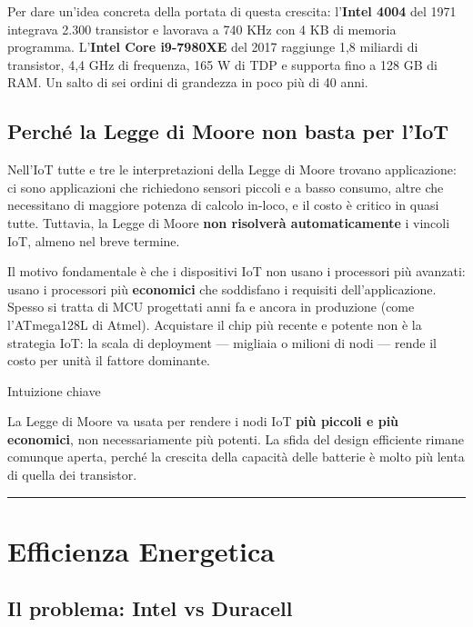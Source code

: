 \documentclass[
  italian,
  openany]{book}
\begin{document}
Per dare un'idea concreta della portata di questa crescita:
l'\textbf{Intel 4004} del 1971 integrava 2.300 transistor e lavorava a
740 KHz con 4 KB di memoria programma. L'\textbf{Intel Core i9-7980XE}
del 2017 raggiunge 1,8 miliardi di transistor, 4,4 GHz di frequenza, 165
W di TDP e supporta fino a 128 GB di RAM. Un salto di sei ordini di
grandezza in poco più di 40 anni.

\subsection{Perché la Legge di Moore non basta per
l'IoT}\label{perchuxe9-la-legge-di-moore-non-basta-per-liot}

Nell'IoT tutte e tre le interpretazioni della Legge di Moore trovano
applicazione: ci sono applicazioni che richiedono sensori piccoli e a
basso consumo, altre che necessitano di maggiore potenza di calcolo
in-loco, e il costo è critico in quasi tutte. Tuttavia, la Legge di
Moore \textbf{non risolverà automaticamente} i vincoli IoT, almeno nel
breve termine.

Il motivo fondamentale è che i dispositivi IoT non usano i processori
più avanzati: usano i processori più \textbf{economici} che soddisfano i
requisiti dell'applicazione. Spesso si tratta di MCU progettati anni fa
e ancora in produzione (come l'ATmega128L di Atmel). Acquistare il chip
più recente e potente non è la strategia IoT: la scala di deployment ---
migliaia o milioni di nodi --- rende il costo per unità il fattore
dominante.

\begin{callouttip}{Intuizione chiave}

La Legge di Moore va usata per rendere i nodi IoT \textbf{più piccoli e
più economici}, non necessariamente più potenti. La sfida del design
efficiente rimane comunque aperta, perché la crescita della capacità
delle batterie è molto più lenta di quella dei transistor.

\end{callouttip}

\begin{center}\rule{0.5\linewidth}{0.5pt}\end{center}

\section{Efficienza Energetica}\label{efficienza-energetica}

\subsection{Il problema: Intel vs
Duracell}\label{il-problema-intel-vs-duracell}
\end{document}
